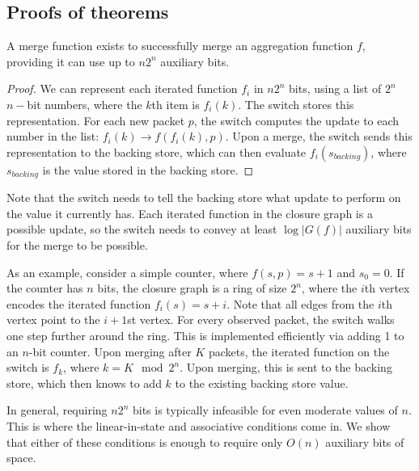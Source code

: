 \subsection{Proofs of theorems}

\begin{theorem}
A merge function exists to successfully merge an aggregation function $f$, providing it can use up to $n2^n$ auxiliary bits.
\end{theorem}
\begin{proof}
We can represent each iterated function $f_i$ in $n2^n$ bits, using a list of $2^n$ $n-$bit numbers, where the $k$th item is $f_i(k)$. The switch stores this representation. For each new packet $p$, the switch computes the update to each number in the list: $f_i(k) \rightarrow f(f_i(k), p)$. Upon a merge, the switch sends this representation to the backing store, which can then evaluate $f_i(s_{backing})$, where $s_{backing}$ is the value stored in the backing store.
\end{proof}

Note that the switch needs to tell the backing store what update to perform on the value it currently has. Each iterated function in the closure graph is a possible update, so the switch needs to convey at least $\log |G(f)|$ auxiliary bits for the merge to be possible.

As an example, consider a simple counter, where $f(s, p) = s + 1$ and $s_0 = 0$. If the counter has $n$ bits, the closure graph is a ring of size $2^n$, where the $i$th vertex encodes the iterated function $f_i(s) = s + i$. Note that all edges from the $i$th vertex point to the $i+1$st vertex. For every observed packet, the switch walks one step further around the ring. This is implemented efficiently via adding 1 to an $n$-bit counter. Upon merging after $K$ packets, the iterated function on the switch is $f_{k}$, where $k = K \mod 2^n$. Upon merging, this is sent to the backing store, which then knows to add $k$ to the existing backing store value.

In general, requiring $n2^n$ bits is typically infeasible for even moderate values of $n$. This is where the linear-in-state and associative conditions come in. We show that either of these conditions is enough to require only $O(n)$ auxiliary bits of space.

